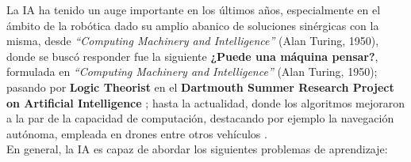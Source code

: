 
La \ac{IA} ha tenido un auge importante en los últimos años, especialmente en el ámbito de la robótica dado su amplio abanico de soluciones sinérgicas con la misma, desde \emph{``Computing Machinery and Intelligence''} (Alan Turing, 1950), donde se buscó responder fue la siguiente \textbf{¿Puede una máquina pensar?}, formulada en \emph{``Computing Machinery and Intelligence''} (Alan Turing, 1950); pasando por \textbf{Logic Theorist} en el \textbf{Dartmouth Summer Research Project on Artificial Intelligence} \cite{logic-theorist}; hasta la actualidad, donde los algoritmos mejoraron a la par de la capacidad de computación, destacando por ejemplo la navegación autónoma, empleada en drones entre otros vehículos \cite{history-ai}.\\

En general, la \ac{IA} es capaz de abordar los siguientes problemas de aprendizaje:

